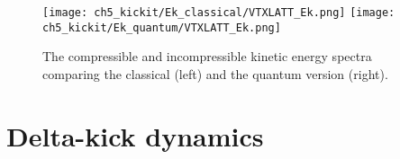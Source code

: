 


\begin{figure}
    \centering
    \texttt{[image: ch5\_kickit/Ek\_classical/VTXLATT\_Ek.png]}
    \texttt{[image: ch5\_kickit/Ek\_quantum/VTXLATT\_Ek.png]}
\iffalse
    \texttt{[image: ch5\_kickit/Ek\_classical/VTXLATT\_Comp.png]}
    \texttt{[image: ch5\_kickit/Ek\_quantum/VTXLATT\_Comp.png]}

    \texttt{[image: ch5\_kickit/Ek\_classical/VTXLATT\_Incomp.png]}
    \texttt{[image: ch5\_kickit/Ek\_quantum/VTXLATT\_Incomp.png]}

    \caption[Kinetic energy spectra with and without quantum phase.]{The kinetic energy spectra (top row), compressible (middle row), and incompressible energies (bottom row), comparing the classical (left) and the quantum version (right). The inclusion of the phase term eliminates the peaks from the compressible energy, yet yields a more accurate representation of the magnitude of both energies (see text).}
\fi
\caption[Kinetic energy spectra with and without quantum phase.]{The compressible and incompressible kinetic energy spectra comparing the classical (left) and the quantum version (right).}
\label{fig:ek_clvqu}
\end{figure}


\section{Delta-kick dynamics}\label{sec:kickvl}
